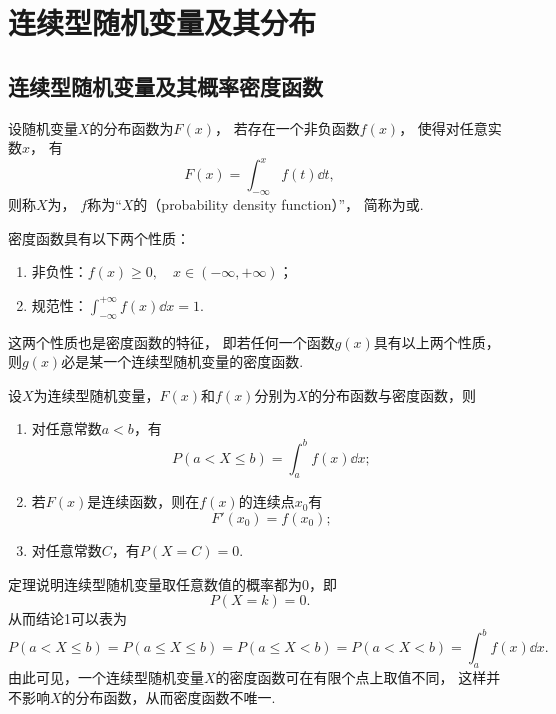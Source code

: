 \section{连续型随机变量及其分布}
\subsection{连续型随机变量及其概率密度函数}
\begin{definition}
设随机变量\(X\)的分布函数为\(F(x)\)，
若存在一个非负函数\(f(x)\)，
使得对任意实数\(x\)，
有\[
	F(x) = \int_{-\infty}^x f(t) \dd{t},
\]
则称\(X\)为，
\(f\)称为“\(X\)的（probability density function）”，
简称为或.
\end{definition}

\begin{property}\label{theorem:随机变量及其分布.连续型随机变量的密度函数的性质}
密度函数具有以下两个性质：
\begin{enumerate}
	\item 非负性：\(f(x) \geq 0, \quad x \in (-\infty,+\infty)\)；
	\item 规范性：\(\int_{-\infty}^{+\infty} f(x) \dd{x} = 1\).
\end{enumerate}
\end{property}
这两个性质也是密度函数的特征，
即若任何一个函数\(g(x)\)具有以上两个性质，
则\(g(x)\)必是某一个连续型随机变量的密度函数.

\begin{theorem}
设\(X\)为连续型随机变量，\(F(x)\)和\(f(x)\)分别为\(X\)的分布函数与密度函数，则
\begin{enumerate}
	\item 对任意常数\(a < b\)，有\[
		P(a < X \leq b) = \int_a^b{f(x) \dd{x}};
	\]

	\item 若\(F(x)\)是连续函数，则在\(f(x)\)的连续点\(x_0\)有\[
		F'(x_0) = f(x_0);
	\]

	\item 对任意常数\(C\)，有\(P(X=C) = 0\).
\end{enumerate}
\end{theorem}

定理说明连续型随机变量取任意数值的概率都为0，即\[
	P(X=k) = 0.
\]
从而结论1可以表为\[
	P(a < X \leq b)
	= P(a \leq X \leq b)
	= P(a \leq X < b)
	= P(a < X < b)
	= \int_a^b f(x) \dd{x}.
\]
由此可见，一个连续型随机变量\(X\)的密度函数可在有限个点上取值不同，
这样并不影响\(X\)的分布函数，从而密度函数不唯一.

